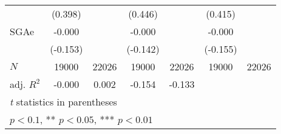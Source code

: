 \begin{table}[htbp]
\begin{tabular}{l*{6}{c}}
            &     (0.398)   &               &     (0.446)   &               &     (0.415)   &               \\
[1em]
SGAe        &      -0.000   &               &      -0.000   &               &      -0.000   &               \\
            &    (-0.153)   &               &    (-0.142)   &               &    (-0.155)   &               \\
\hline
\(N\)       &       19000   &       22026   &       19000   &       22026   &       19000   &       22026   \\
adj. \(R^{2}\)&      -0.000   &       0.002   &      -0.154   &      -0.133   &               &               \\
\hline\hline
\multicolumn{7}{l}{\footnotesize \textit{t} statistics in parentheses}\\
\multicolumn{7}{l}{\footnotesize * \(p<0.1\), ** \(p<0.05\), *** \(p<0.01\)}\\
\end{tabular}
\end{table}
